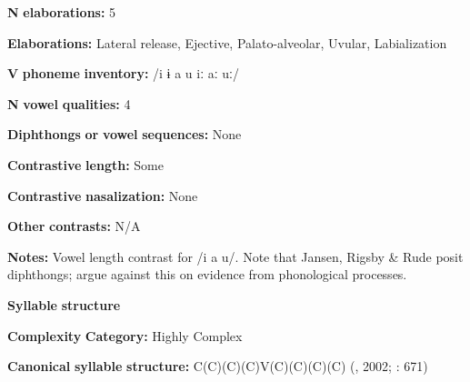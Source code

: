 \documentclass[output=paper]{langsci/langscibook}
\begin{document}
\begin{styleBody}
\textbf{N} \textbf{elaborations:} 5
\end{styleBody}

\begin{styleBody}
\textbf{Elaborations:} Lateral release, Ejective, Palato-alveolar, Uvular, Labialization
\end{styleBody}

\begin{styleBody}
\textbf{V} \textbf{phoneme} \textbf{inventory:} /i ɨ a u iː aː uː/
\end{styleBody}

\begin{styleBody}
\textbf{N} \textbf{vowel} \textbf{qualities:} 4
\end{styleBody}

\begin{styleBody}
\textbf{Diphthongs} \textbf{or} \textbf{vowel} \textbf{sequences:} None
\end{styleBody}

\begin{styleBody}
\textbf{Contrastive} \textbf{length:} Some
\end{styleBody}

\begin{styleBody}
\textbf{Contrastive} \textbf{nasalization:} None
\end{styleBody}

\begin{styleBody}
\textbf{Other} \textbf{contrasts:} N/A
\end{styleBody}

\begin{styleBody}
\textbf{Notes:} Vowel length contrast for /i a u/. Note that Jansen, Rigsby \& Rude posit diphthongs; \citet{HargusBeavert2006} argue against this on evidence from phonological processes.
\end{styleBody}

\begin{styleBody}
\textbf{Syllable} \textbf{structure}
\end{styleBody}

\begin{styleBody}
\textbf{Complexity} \textbf{Category:} Highly Complex
\end{styleBody}

\begin{styleBody}
\textbf{Canonical} \textbf{syllable} \textbf{structure:} C(C)(C)(C)V(C)(C)(C)(C) (\citealt{HargusBeavert2006}, 2002; \citealt{RigsbyRude1996}: 671)
\end{styleBody}
\end{document}
